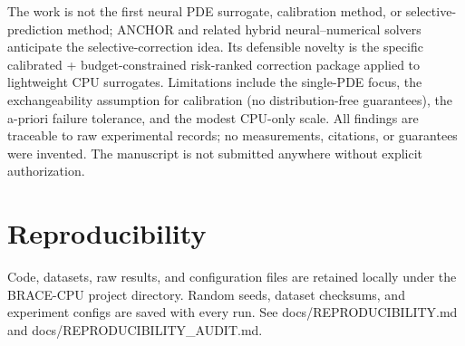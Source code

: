 \documentclass[11pt]{article}
\begin{document}
The work is not the first neural PDE surrogate, calibration method, or
selective-prediction method; ANCHOR \citep{roy2025anchor} and related hybrid
neural--numerical solvers anticipate the selective-correction idea. Its
defensible novelty is the specific calibrated + budget-constrained risk-ranked
correction package applied to lightweight CPU surrogates. Limitations include the
single-PDE focus, the exchangeability assumption for calibration (no
distribution-free guarantees), the a-priori failure tolerance, and the modest
CPU-only scale. All findings are traceable to raw experimental records; no
measurements, citations, or guarantees were invented. The manuscript is not
submitted anywhere without explicit authorization.

\section*{Reproducibility}
Code, datasets, raw results, and configuration files are retained locally under the BRACE-CPU project directory. Random seeds, dataset checksums, and experiment configs are saved with every run. See docs/REPRODUCIBILITY.md and docs/REPRODUCIBILITY_AUDIT.md.
\end{document}
